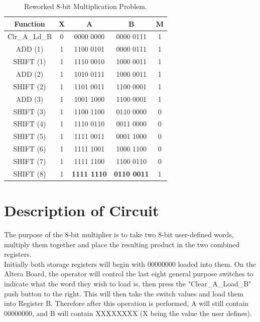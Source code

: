 \documentclass[journal, twocolumn, final,11pt,letterpaper]{IEEEtran}
\begin{document}
\begin{table}[htbp]
	\centering
	\caption{Reworked 8-bit Multiplication Problem. }
	\begin{tabular}{ccccc}	%
		\toprule	%
		Function & X & A & B & M \\
		\midrule
		Clr\_A\_Ld\_B & 0 & 0000 0000 & 0000 0111 & 1 \\ 
		ADD (1)    & 1 & 1100 0101 & 0000 0111 & 1 \\
		SHIFT (1)  & 1 & 1110 0010 & 1000 0011 & 1 \\

		ADD (2)    & 1 & 1010 0111 & 1000 0011 & 1 \\
		SHIFT (2)  & 1 & 1101 0011 & 1100 0001 & 1 \\		
		ADD (3)    & 1 & 1001 1000 & 1100 0001 & 1 \\
		SHIFT (3)  & 1 & 1100 1100 & 0110 0000 & 0 \\		
		SHIFT (4)  & 1 & 1110 0110 & 0011 0000 & 0 \\		
		SHIFT (5)  & 1 & 1111 0011 & 0001 1000 & 0 \\		
		SHIFT (6)  & 1 & 1111 1001 & 1000 1100 & 0 \\		
		SHIFT (7)  & 1 & 1111 1100 & 1100 0110 & 0 \\		
		SHIFT (8)  & 1 & \textbf{1111 1110} & \textbf{0110 0011} & 1 \\
		\bottomrule	%
	\end{tabular}%
	\label{tab:table1}	%
\end{table}%


\section{Description of Circuit}
The purpose of the 8-bit multiplier is to take two 8-bit user-defined words, multiply them together and place the resulting product in the two combined registers. \\

Initially both storage registers will begin with 00000000 loaded into them. On the Altera Board, the operator will control the last eight general purpose switches to indicate what the word they wish to load is, then press the "Clear\_A\_Load\_B" push button to the right. This will then take the switch values and load them into Register B. Therefore after this operation is performed, A will still contain 00000000, and B will contain XXXXXXXX (X being the value the user defines).\\
\end{document}
